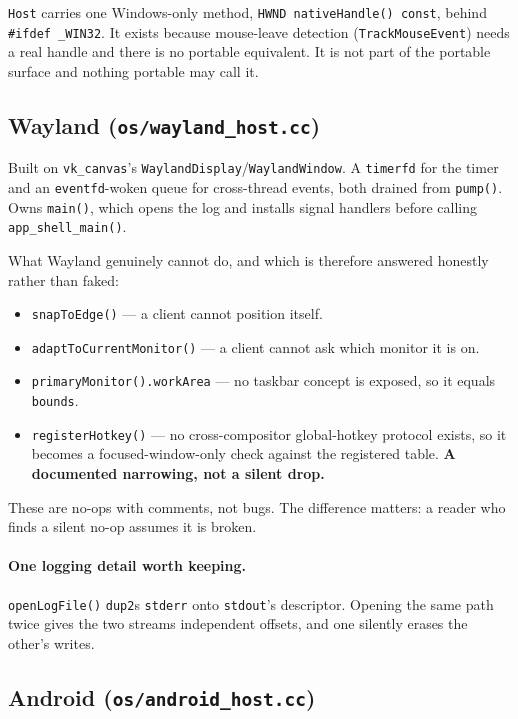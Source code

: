 \documentclass[11pt,a4paper]{article}
\begin{document}
\texttt{Host} carries one Windows-only method,
\texttt{HWND~nativeHandle()~const}, behind \texttt{\#ifdef~\_WIN32}. It exists because mouse-leave detection
(\texttt{TrackMouseEvent}) needs a real handle and there is no portable
equivalent. It is not part of the portable surface and nothing portable may call
it.

\subsection{Wayland (\texttt{os/wayland\_host.cc})}

Built on \texttt{vk\_canvas}'s \texttt{WaylandDisplay}/\texttt{WaylandWindow}. A
\texttt{timerfd} for the timer and an \texttt{eventfd}-woken queue for
cross-thread events, both drained from \texttt{pump()}. Owns \texttt{main()},
which opens the log and installs signal handlers before calling
\texttt{app\_shell\_main()}.

What Wayland genuinely cannot do, and which is therefore answered honestly
rather than faked:

\begin{itemize}[leftmargin=*]
\item \texttt{snapToEdge()} --- a client cannot position itself.
\item \texttt{adaptToCurrentMonitor()} --- a client cannot ask which monitor it
  is on.
\item \texttt{primaryMonitor().workArea} --- no taskbar concept is exposed, so
  it equals \texttt{bounds}.
\item \texttt{registerHotkey()} --- no cross-compositor global-hotkey protocol
  exists, so it becomes a focused-window-only check against the registered
  table. \textbf{A documented narrowing, not a silent drop.}
\end{itemize}

These are no-ops with comments, not bugs. The difference matters: a reader who
finds a silent no-op assumes it is broken.

\paragraph{One logging detail worth keeping.} \texttt{openLogFile()}
\texttt{dup2}s \texttt{stderr} onto \texttt{stdout}'s descriptor. Opening the
same path twice gives the two streams independent offsets, and one silently
erases the other's writes.

\subsection{Android (\texttt{os/android\_host.cc})}
\label{sec:android}
\end{document}
